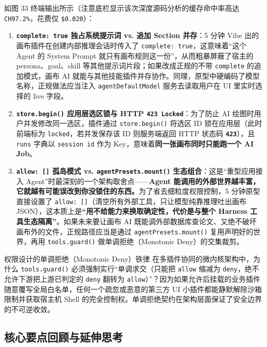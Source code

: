 \documentclass[a4paper]{article}
\begin{document}
如图 33 终端输出所示（注意底栏显示该次深度源码分析的缓存命中率高达 \texttt{CH97.2\%}，花费仅 \texttt{\$0.020}）：
\begin{enumerate}
    \item \textbf{\texttt{complete: true} 独占系统提示词 vs. 追加 Section 并存}：5 分钟 Vibe 出的画布插件在创建内部推理会话时传入了 \texttt{complete: true}，这意味着“这个 Agent 的 System Prompt 就只有画布规则这一份”，从而粗暴屏蔽了宿主的 persona、goal、skill 等其他提示词片段；如果改成正规的不带 \texttt{complete} 的追加模式，画布 AI 就能与其他技能插件并存协作。同理，原型中硬编码了模型名称，正规做法应当注入 \texttt{agentDefaultModel} 服务去读取用户在 UI 里实时选择的 live 字段。
    \item \textbf{\texttt{store.begin()} 应用层选区锁与 HTTP \texttt{423 Locked}}：为了防止 AI 绘图时用户并发修改同一选区，插件通过 \texttt{store.begin()} 将选区 ID 锁在应用层（此时前端标为 \texttt{locked}，若并发保存该 ID 则服务端返回 HTTP 状态码 \textbf{\texttt{423}}），且 \texttt{runs} 字典以 \texttt{session id} 作为 Key，意味着\textbf{同一张画布同时只能跑一个 AI Job}。
    \item \textbf{\texttt{allow: []} 孤岛模式 vs. \texttt{agentPresets.mount()} 生态组合}：这是“重型应用接入 Agent”时最深刻的一个架构取舍点——\textbf{Agent 能调用的外部世界越丰富，它就越有可能误改到你没锁住的东西。}为了省去细粒度权限控制，5 分钟原型直接设置了 \texttt{allow: []}（清空所有外部工具，只让模型纯靠推理吐出画布 JSON），这本质上是\textbf{“用不给能力来换取确定性，代价是与整个 Harness 工具生态隔离”}。如果未来要让画布 AI 既能调外部数据库查论文、又绝不破坏画布外的文件，正规路径应当是通过 \texttt{agentPresets.mount()} 复用声明好的世界，再用 \texttt{tools.guard()} 做单调拒绝（Monotonic Deny）的交集裁剪。
\end{enumerate}

\begin{warningbox}{权限设计的单调拒绝（Monotonic Deny）铁律}
在多插件协同的微内核架构中，为什么 \texttt{tools.guard()} 必须强制实行“单调求交（只能把 \texttt{allow} 缩减为 \texttt{deny}，绝不允许下游把上游已判定的 \texttt{deny} 翻转为 \texttt{allow}）”？因为如果允许后挂载的业务插件随意覆写全局白名单，任何一个疏忽或恶意的第三方 UI 小插件都能静默解除沙箱限制并获取宿主机 Shell 的完全控制权。单调拒绝契约在架构层面保证了安全边界的不可逆收敛。
\end{warningbox}

\subsection{核心要点回顾与延伸思考}
\end{document}
